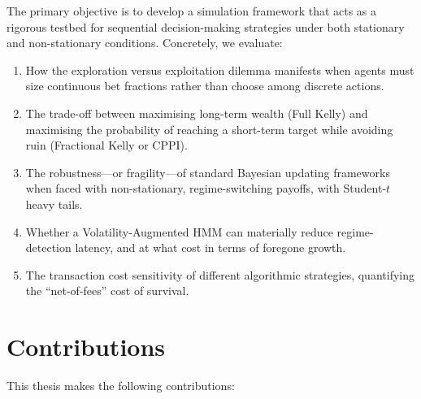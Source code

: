 The primary objective is to develop a simulation framework that acts as a
rigorous testbed for sequential decision-making strategies under both
stationary and non-stationary conditions. Concretely, we evaluate:

\begin{enumerate}
    \item How the exploration versus exploitation dilemma manifests when
    agents must size continuous bet fractions rather than choose among
    discrete actions.

    \item The trade-off between maximising long-term wealth (Full Kelly)
    and maximising the probability of reaching a short-term target while
    avoiding ruin (Fractional Kelly or CPPI).

    \item The robustness---or fragility---of standard Bayesian updating
    frameworks when faced with non-stationary, regime-switching payoffs,
    with Student-$t$ heavy tails.

    \item Whether a Volatility-Augmented HMM can materially reduce
    regime-detection latency, and at what cost in terms of foregone
    growth.

    \item The transaction cost sensitivity of different algorithmic
    strategies, quantifying the ``net-of-fees'' cost of survival.
\end{enumerate}

\section{Contributions}

This thesis makes the following contributions:

